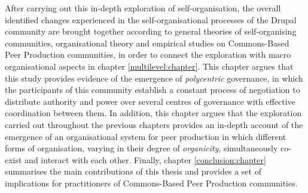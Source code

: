 After carrying out this in-depth exploration of self-organisation, the overall identified changes experienced in the self-organisational processes of the Drupal community are brought together according to general theories of self-organising communities, organisational theory and empirical studies on Commons-Based Peer Production communities, in order to connect the exploration with macro organisational aspects in chapter \ref{multilevel:chapter}. This chapter argues that this study provides evidence of the emergence of \textit{polycentric} governance, in which the participants of this community establish a constant process of negotiation to distribute authority and power over several centres of governance with effective coordination between them. In addition, this chapter argues that the exploration carried out throughout the previous chapters provides an in-depth account of the emergence of an organisational system for peer production in which different forms of organisation, varying in their degree of \textit{organicity}, simultaneously co-exist and interact with each other. Finally, chapter \ref{conclusion:chapter} summarises the main contributions of this thesis and provides a set of implications for practitioners of Commons-Based Peer Production communities.